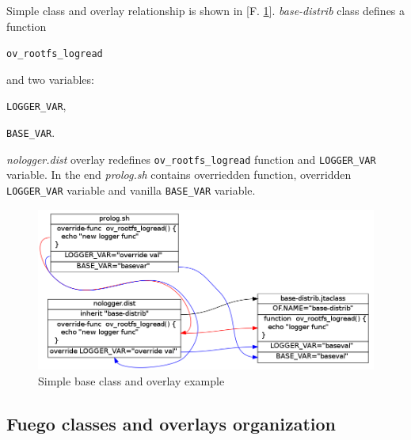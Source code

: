 Simple class and overlay relationship is shown in [F. \ref{fig:base_ov_example}].
\textit{base-distrib} class defines a function
\begin{description}
\item \texttt{ov\_rootfs\_logread}
\end{description}

and two variables:
\begin{description}
\item \texttt{LOGGER\_VAR},
\item \texttt{BASE\_VAR}.
\end{description}

\textit{nologger.dist} overlay redefines \texttt{ov\_rootfs\_logread} function and \texttt{LOGGER\_VAR} variable. In the end \textit{prolog.sh} contains overriedden function, overridden \texttt{LOGGER\_VAR} variable and vanilla \texttt{BASE\_VAR} variable.


\begin{figure}[H]
  \includegraphics*[width=16cm]{overlays_example.png}
  \caption{Simple base class and overlay example}
  \label{fig:base_ov_example}
\end{figure}


\subsection{Fuego classes and overlays organization}
\label{sec:fuego_class_ov}

